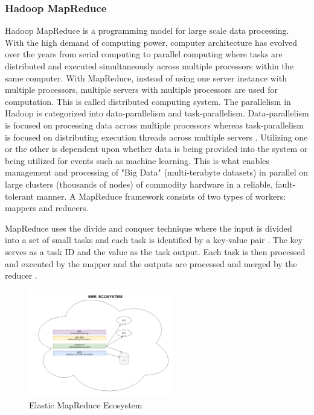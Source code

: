 \documentclass[journal]{IEEEtran}
\begin{document}
\subsubsection{Hadoop MapReduce}

Hadoop MapReduce is a programming model for large scale data processing. 
With the high demand of computing power,
 computer architecture has evolved over the years from serial computing to parallel computing
 where tasks are distributed and executed simultaneously across multiple processors within the same computer. 
With MapReduce,
 instead of using one server instance with multiple processors, 
 multiple servers with multiple processors are used for computation.
This is called distributed computing system. 
The parallelism in Hadoop is categorized into data-parallelism and task-parallelism.
Data-parallelism is focused on processing data across multiple processors whereas
 task-parallelism is focused on distributing execution threads across multiple servers \cite{Parallelism}. 
Utilizing one or the other is dependent upon whether data is being provided into
 the system or being utilized for events such as machine learning. 
This is what enables management and processing of "Big Data" (multi-terabyte datasets)
 in parallel on large clusters (thousands of nodes) of commodity hardware in a reliable,
 fault-tolerant manner. 
A MapReduce framework consists of two types of workers: mappers and reducers.

MapReduce uses the divide and conquer technique where the input is divided into a set
 of small tasks and each task is identified by a key-value pair \cite{Divide-and-Conquer}.
The key serves as a task ID and the value as the task output.
Each task is then processed and executed by the mapper and
the outputs are processed and merged by the reducer \cite{MapReduce}.

\begin{figure}
    \centering
    \includegraphics[width=2.5in]{EMR_Ecosystem.png}
    \caption{Elastic MapReduce Ecosystem}
    \label{EMR}
\end{figure}
\end{document}
